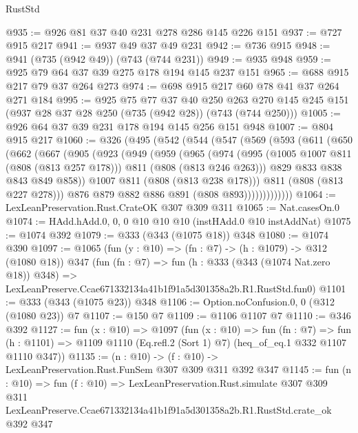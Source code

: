 \begin{lexlean}{RustStd}
\begin{coremodule}
@935 := @926 @81 @37 @40 @231 @278 @286 @145 @226 @151
@937 := @727 @915 @217
@941 := @937 @49 @37 @49 @231
@942 := @736 @915
@948 := @941 (@735 (@942 @49)) (@743 (@744 @231))
@949 := @935 @948
@959 := @925 @79 @64 @37 @39 @275 @178 @194 @145 @237 @151
@965 := @688 @915 @217 @79 @37 @264 @273
@974 := @698 @915 @217 @60 @78 @41 @37 @264 @271 @184
@995 := @925
    @75
    @77
    @37
    @40
    @250
    @263
    @270
    @145
    @245
    @151
    (@937 @28 @37 @28 @250 (@735 (@942 @28)) (@743 (@744 @250)))
@1005 := @926 @64 @37 @39 @231 @178 @194 @145 @256 @151 @948
@1007 := @804 @915 @217
@1060 := @326
    (@495
      (@542
        (@544
          (@547
            (@569
              (@593
                (@611
                  (@650
                    (@662
                      (@667
                        (@905
                          (@923
                            (@949
                              (@959
                                (@965
                                  (@974
                                    (@995
                                      (@1005 @1007 @811 (@808 (@813 @257 @178)))
                                      @811
                                      (@808 (@813 @246 @263)))
                                    @829
                                    @833
                                    @838
                                    @843
                                    @849
                                    @858))
                                @1007
                                @811
                                (@808 (@813 @238 @178)))
                              @811
                              (@808 (@813 @227 @278)))
                            @876
                            @879
                            @882
                            @886
                            @891
                            (@808 @893)))))))))))))
@1064 := LexLeanPreservation.Rust.CrateOK @307 @309 @311
@1065 := Nat.casesOn.{0}
@1074 := HAdd.hAdd.{0, 0, 0} @10 @10 @10 (instHAdd.{0} @10 instAddNat)
@1075 := @1074 @392
@1079 := @333 (@343 (@1075 @18)) @348
@1080 := @1074 @390
@1097 := @1065
    (fun (y : @10) => (fn : @7) -> (h : @1079) -> @312 (@1080 @18))
    @347
    (fun (fn : @7) =>
    fun (h : @333 (@343 (@1074 Nat.zero @18)) @348) =>
    LexLeanPreserve.Ccae671332134a41b1f91a5d301358a2b.R1.RustStd.fun0)
@1101 := @333 (@343 (@1075 @23)) @348
@1106 := Option.noConfusion.{0, 0} (@312 (@1080 @23)) @7
@1107 := @150 @7
@1109 := @1106 @1107 @7
@1110 := @346 @392
@1127 := fun (x : @10) =>
  @1097
    (fun (x : @10) =>
    fun (fn : @7) =>
    fun (h : @1101) => @1109 @1110 (Eq.refl.{2} (Sort 1) @7) (heq_of_eq.{1} @332 @1107 @1110 @347))
@1135 := (n : @10) -> (f : @10) -> LexLeanPreservation.Rust.FunSem @307 @309 @311 @392 @347
@1145 := fun (n : @10) =>
  fun (f : @10) =>
  LexLeanPreservation.Rust.simulate
    @307
    @309
    @311
    LexLeanPreserve.Ccae671332134a41b1f91a5d301358a2b.R1.RustStd.crate_ok
    @392
    @347
\end{coremodule}
\end{lexlean}
